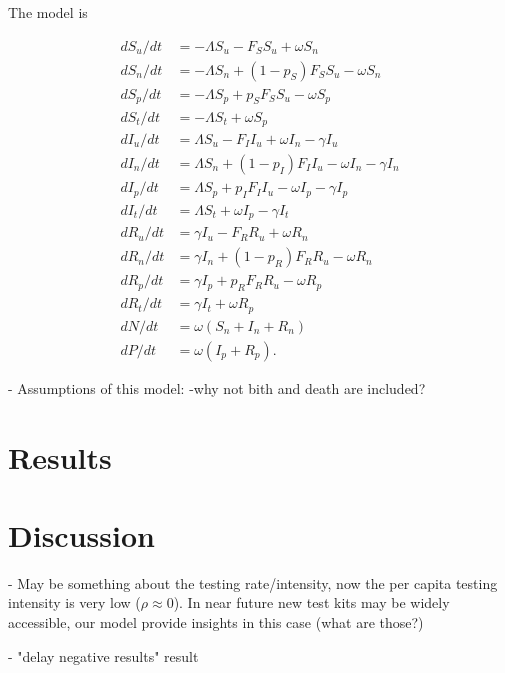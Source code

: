 \documentclass{article}
\begin{document}
The model is

\begin{align}
\label{model}
 d S_u/dt &= -\Lambda S_u - F_S S_u + \omega S_n \\
 d S_n/dt &= -\Lambda S_n + (1-p_S) F_S S_u - \omega S_n \\
 d S_p/dt &= -\Lambda S_p + p_S F_S S_u - \omega S_p \\
 d S_t/dt &= -\Lambda S_t + \omega S_p \\
 d I_u/dt &= \Lambda S_u - F_I I_u + \omega I_n  - \gamma I_u  \\
 d I_n/dt &= \Lambda S_n + (1-p_I) F_I I_u - \omega I_n -\gamma I_n \\
 d I_p/dt &= \Lambda S_p + p_I F_I I_u - \omega I_p -\gamma I_p \\
 d I_t/dt &= \Lambda S_t + \omega I_p - \gamma I_t  \\
 d R_u/dt &= \gamma I_u - F_R R_u + \omega R_n \\
 d R_n/dt &= \gamma I_n + (1-p_R) F_R R_u - \omega R_n  \\
 d R_p/dt &= \gamma I_p + p_R F_R R_u  - \omega R_p  \\
 d R_t/dt&= \gamma I_t + \omega R_p  \\
 dN/dt &= \omega (S_n + I_n + R_n)   \\
 dP/dt &= \omega(I_p + R_p).
\end{align}

- Assumptions of this model:
-why not bith and death are included?

\section{Results}


\section{Discussion}

- May be something about the testing rate/intensity, now the per capita testing intensity is very low ($\rho \approx 0$). In near future new test kits may be widely accessible, our model provide insights in this case (what are those?)

- "delay negative results" result



\end{document}
